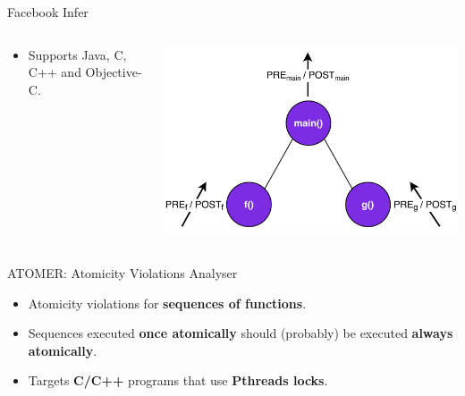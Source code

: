 \documentclass[10pt, usenames, dvipsnames, aspectratio=169]{beamer}
\begin{document}
\begin{frame}{Facebook Infer}
\begin{columns}[t]
\begin{column}{0.6 \linewidth}
\begin{itemize}
                \item
                    Supports Java, C, C++ and Objective-C.
            \end{itemize}
        \end{column}

        \begin{column}{0.4 \linewidth}
            \begin{center}
                \includegraphics[width=1 \linewidth]{images/infer.pdf}
            \end{center}
        \end{column}
    \end{columns}
\end{frame}


\begin{frame}{ATOMER: Atomicity Violations Analyser}
    \large

    \begin{itemize}
        \item
            Atomicity violations for \alert{\textbf{sequences
            of functions}}.
            \vspace{1em}

        \item
            Sequences executed \alert{\textbf{once atomically}}
            should (probably) be executed \alert{\textbf{always
            atomically}}.
            \vspace{1em}

        \item
            Targets \alert{\textbf{C/C++}} programs that use
            \alert{\textbf{Pthreads locks}}.
    \end{itemize}
\end{frame}
\end{document}
